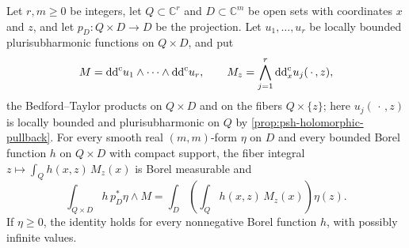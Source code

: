 \begin{lemma}\label{lem:bounded-product-fibre-fubini}
Let $r,m\geq0$ be integers, let $Q\subset\mathbb C^r$ and $D\subset\mathbb C^m$ be open sets with coordinates $x$ and $z$, and let $p_D\colon Q\times D\to D$ be the projection. Let $u_1,\ldots,u_r$ be locally bounded plurisubharmonic functions on $Q\times D$, and put
\[
 M=\mathrm{dd}^{\mathrm{c}} u_1\wedge\cdots\wedge\mathrm{dd}^{\mathrm{c}} u_r,\qquad
 M_z=\bigwedge_{j=1}^r\mathrm{dd}^{\mathrm{c}}_x u_j(\,\cdot\,,z),
\]
the Bedford--Taylor products on $Q\times D$ and on the fibers $Q\times\{z\}$; here $u_j(\,\cdot\,,z)$ is locally bounded and plurisubharmonic on $Q$ by \cref{prop:psh-holomorphic-pullback}. For every smooth real $(m,m)$-form $\eta$ on $D$ and every bounded Borel function $h$ on $Q\times D$ with compact support, the fiber integral $z\mapsto\int_Q h(x,z)\,M_z(x)$ is Borel measurable and
\begin{equation}\label{eq:bounded-product-fibre-fubini}
 \int_{Q\times D}h\,p_D^*\eta\wedge M
       =\int_D\left(\int_Q h(x,z)\,M_z(x)\right)\eta(z).
\end{equation}
If $\eta\geq0$, the identity holds for every nonnegative Borel function $h$, with possibly infinite values.
\end{lemma}
